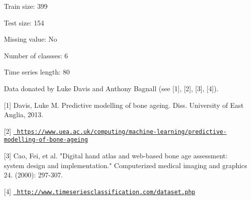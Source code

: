 Train size\+: 399

Test size\+: 154

Missing value\+: No

Number of classses\+: 6

Time series length\+: 80

Data donated by Luke Davis and Anthony Bagnall (see \mbox{[}1\mbox{]}, \mbox{[}2\mbox{]}, \mbox{[}3\mbox{]}, \mbox{[}4\mbox{]}).

\mbox{[}1\mbox{]} Davis, Luke M. Predictive modelling of bone ageing. Diss. University of East Anglia, 2013.

\mbox{[}2\mbox{]} \href{https://www.uea.ac.uk/computing/machine-learning/predictive-modelling-of-bone-ageing}{\texttt{ https\+://www.\+uea.\+ac.\+uk/computing/machine-\/learning/predictive-\/modelling-\/of-\/bone-\/ageing}}

\mbox{[}3\mbox{]} Cao, Fei, et al. "{}\+Digital hand atlas and web-\/based bone age assessment\+: system design and implementation."{} Computerized medical imaging and graphics 24. (2000)\+: 297-\/307.

\mbox{[}4\mbox{]} \href{http://www.timeseriesclassification.com/dataset.php}{\texttt{ http\+://www.\+timeseriesclassification.\+com/dataset.\+php}} 